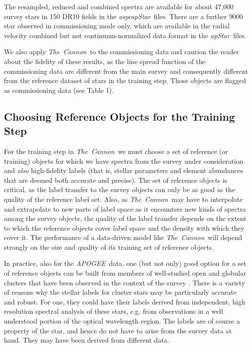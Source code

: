 \documentclass[12pt, preprint]{aastex}
\newcommand{\tc}{\textsl{The~Cannon}}
\newcommand{\apogee}{\textsl{APOGEE}}
\newcommand{\aspcapstar}{\textsl{aspcapStar}}
\newcommand{\apstar}{\textsl{apStar}}
\begin{document}
The resampled, reduced and combined spectra are available for about 47,000 survey stars in 150 DR10 fields in the \aspcapstar\ files. There are a further 9000 star observed in commissioning mode only, which are available in the radial velocity combined but not continuum-normalized data format in the \apstar\ files.

We also apply \tc\ to the commissioning data and caution the reader about the fidelity of these results, as the line spread function of the commissioning data are different from the main survey and consequently different from the reference dataset of stars in the training step. Those objects are flagged as commissioning data (see Table 1).



\subsection{Choosing Reference Objects for the Training Step}
\label{sec:ReferenceObjects}

For the training step in \tc\ we must choose a set of reference (or training) objects for which we have spectra from the survey under consideration and \emph{also} high-fidelity labels (that is, stellar parameters and element abundances that are deemed both accurate and precise).
The set of reference objects is critical, as the label transfer to the survey objects can only be as good as the quality of the reference label set. 
Also, as \tc\ may have to interpolate and extrapolate to new parts of label space as
it encounters new kinds of spectra among the survey objects, the quality
of the label transfer depends on the extent to which the reference objects
cover label space and the density with which they cover it.
The performance of a data-driven model like \tc\ will depend strongly on the size and quality of its training set of reference objects.

In practice, also for the \apogee\ data, one (but not only) good option
for a set of reference objects can be built from 
members of well-studied open and globular clusters that have been observed in the context of the survey \citep{Zaso2013, Meszaros2013}.
There is a variety of reasons why the stellar labels for cluster stars may be particularly accurate and robust.
For one, they could have their labels derived from independent, high resolution spectral analysis of these
stars, e.g. from observations in a well understood portion of the optical wavelength region. The
labels are of course a property of the
star, and hence do not have to arise from the survey data at hand. They may have been derived from different data.
\end{document}
